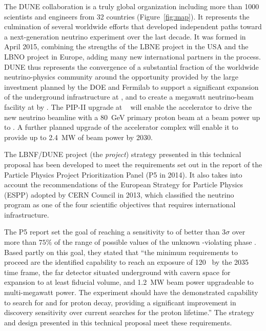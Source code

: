The DUNE collaboration is a truly global organization including more than \num{1000} scientists and engineers from \num{32} countries (Figure~\ref{fig:map}). It represents
the culmination of several worldwide efforts that developed independent paths toward a next-generation  neutrino experiment over the last decade.
It was formed in April 2015, combining the strengths of the LBNE project in the USA and the LBNO project in Europe, adding many new international 
partners in the process. DUNE thus represents the convergence of a substantial fraction of the worldwide neutrino-physics community around the 
opportunity provided by the large investment planned by the DOE and Fermilab to support 
a significant expansion of the underground infrastructure at \surf{}, and to create a megawatt neutrino-beam facility at  \fnal by \beamturnon{}. 
The PIP-II upgrade at \fnal~\cite{pip2-2013} 
will enable the accelerator to drive the new neutrino beamline with %
a \SI{80}{\GeV} primary proton beam at a beam power %
up to \pipiibeampower{}. A further planned upgrade 
of the accelerator complex will enable it to provide up to \SI{2.4}{\MW} of beam power by 2030. 

The LBNF/DUNE project (the \textit{project}) strategy presented in this technical proposal has been developed to meet the requirements set out in the report of the Particle Physics Project Prioritization Panel (P5 in 2014). It also takes into account the recommendations of the European Strategy for Particle  Physics (ESPP) adopted by CERN Council in 2013, which classified the  neutrino program as one of the four scientific objectives that requires international infrastructure.

The P5 report set the goal of reaching a sensitivity to  of better than \num{3}$\sigma$ over more than $75\%$ 
of the range of possible values of the unknown -violating phase \deltacp.
Based partly on this goal, they stated that ``the 
minimum requirements to proceed are the identified capability to reach an exposure 
of \num{120}~\ktMWyr{} by the 2035 time frame, the far detector situated underground 
with cavern space for expansion to at least \fdfiducialmass \lar fiducial volume, and \SI{1.2}{MW} 
beam power upgradeable to multi-megawatt power.
The experiment should have the demonstrated 
capability to search for  and for proton decay, providing a significant 
improvement in discovery sensitivity over current searches for the proton lifetime.'' The strategy and design presented in this technical proposal meet these requirements.


